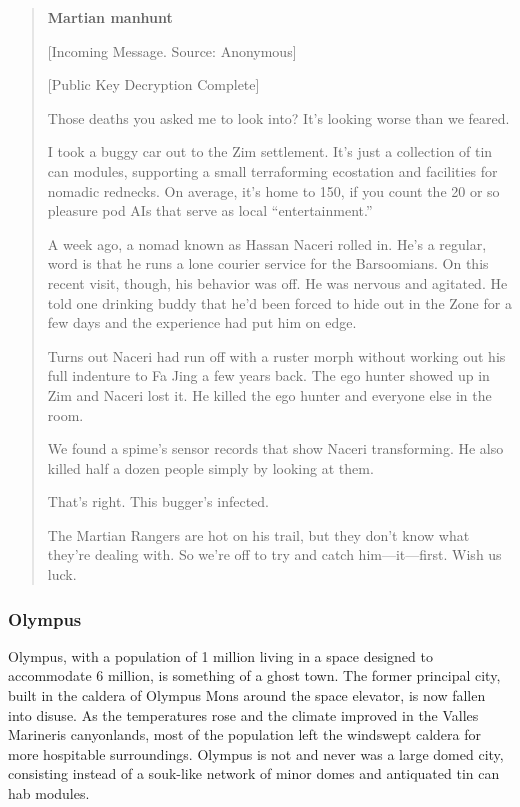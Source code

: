 \begin{quotation}
  \textbf{Martian manhunt}
  
  [Incoming Message. Source: Anonymous]

  [Public Key Decryption Complete]

  Those deaths you asked me to look into? It’s looking worse than we
  feared.

  I took a buggy car out to the Zim settlement. It’s just a collection
  of tin can modules, supporting a small terraforming ecostation and
  facilities for nomadic rednecks. On average, it’s home to 150, if
  you count the 20 or so pleasure pod AIs that serve as local
  “entertainment.”

  A week ago, a nomad known as Hassan Naceri rolled in. He’s a
  regular, word is that he runs a lone courier service for the
  Barsoomians. On this recent visit, though, his behavior was off. He
  was nervous and agitated. He told one drinking buddy that he’d been
  forced to hide out in the Zone for a few days and the experience had
  put him on edge.

  Turns out Naceri had run off with a ruster morph without working out
  his full indenture to Fa Jing a few years back. The ego hunter
  showed up in Zim and Naceri lost it. He killed the ego hunter and
  everyone else in the room.

  We found a spime’s sensor records that show Naceri transforming. He
  also killed half a dozen people simply by looking at them.

  That’s right. This bugger’s infected.

  The Martian Rangers are hot on his trail, but they don’t know what
  they’re dealing with. So we’re off to try and catch
  him—it—first. Wish us luck.
\end{quotation}

\subsubsection{Olympus}
\label{sec:olympus}

Olympus, with a population of 1 million living in a space designed to
accommodate 6 million, is something of a ghost town. The former
principal city, built in the caldera of Olympus Mons around the space
elevator, is now fallen into disuse. As the temperatures rose and the
climate improved in the Valles Marineris canyonlands, most of the
population left the windswept caldera for more hospitable
surroundings. Olympus is not and never was a large domed city,
consisting instead of a souk-like network of minor domes and
antiquated tin can hab modules.

